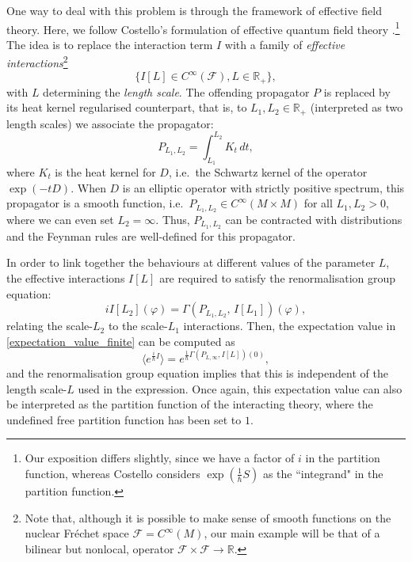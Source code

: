 \documentclass[reqno]{amsart}
\theoremstyle{definition}
\theoremstyle{remark}
\renewcommand{\phi}{\varphi}
\newcommand{\R}{\mathbb{R}}
\newcommand{\C}{C^\infty}
\newcommand{\F}{\mathcal{F}}
\newcommand{\h}{\hbar}
\begin{document}
One way to deal with this problem is through the framework of effective field theory. Here, we follow Costello's formulation of effective quantum field theory \cite{costello}.\footnote{Our exposition differs slightly, since we have a factor of $i$ in the partition function, whereas Costello considers $\exp(\frac{1}{\h}S)$ as the ``integrand" in the partition function.} The idea is to replace the interaction term $I$ with a family of \emph{effective interactions}\footnote{Note that, although it is possible to make sense of smooth functions on the nuclear Fréchet space $\F=\C(M)$, our main example will be that of a bilinear but nonlocal, operator $\F\times \F\to \mathbb{R}$.} 
$$\{I[L]\in\C(\F), L\in\R_+\},$$
with $L$ determining the \emph{length scale}.  The offending propagator $P$ is replaced by its heat kernel regularised counterpart, that is, to $L_1, L_2 \in \R_+$ (interpreted as two length scales) we associate the propagator:
$$P_{L_1,L_2} = \int_{L_1}^{L_2}K_t\,dt,$$
where $K_t$ is the heat kernel for $D$, i.e.\ the Schwartz kernel of the operator $\exp(-tD)$. When $D$ is an elliptic operator with strictly positive spectrum, this propagator is a smooth function, i.e.\ $P_{L_1,L_2} \in \C(M\times M)$ for all $L_1,L_2 > 0$, where we can even set $L_2=\infty$. Thus, $P_{L_1,L_2}$ can be contracted with distributions and the Feynman rules are well-defined for this propagator. 

In order to link together the behaviours at different values of the parameter $L$, the effective interactions $I[L]$ are required to satisfy the renormalisation group equation:
\begin{equation}
\label{RGE}
iI[L_2](\phi) = \Gamma(P_{L_1,L_2},\, I[L_1])(\phi),
\end{equation}
relating the scale-$L_2$ to the scale-$L_1$ interactions. Then, the expectation value in \eqref{expectation_value_finite} can be computed as 
\begin{equation}
\label{expectation_value}
    \biggl\langle e^{\frac{i}{\hbar}I} \biggr\rangle = e^{\frac{1}{\h}\Gamma(P_{L,\infty}, I[L])(0)},
\end{equation}
and the renormalisation group equation implies that this is independent of the length scale-$L$ used in the expression. Once again, this expectation value can also be interpreted as the partition function of the interacting theory, where the undefined free partition function has been set to $1$.
\end{document}
